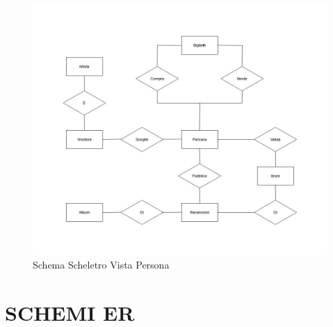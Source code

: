 \documentclass{article}
\begin{document}
\begin{figure}[h]
    \centering
    \includegraphics[width=1\linewidth]{images/Schema Scheletro Persona.jpg}
    \caption{Schema Scheletro Vista Persona}
    \label{fig:enter-label}
\end{figure}

\newpage

\section{SCHEMI ER}
\end{document}
